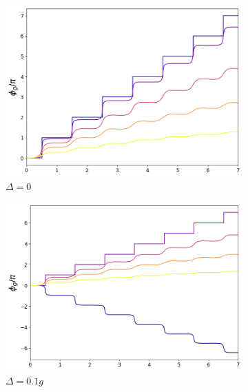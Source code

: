 \begin{figure}[H]
    \centering
    \begin{subfigure}{0.49\textwidth}
        \centering
        \includegraphics[width=\textwidth]{figuras/ch3/fg kerr.png}
        \caption{$\Delta=0$}
        \label{fig3:fg kerr 1}
    \end{subfigure}
    \vfill
    \begin{subfigure}{0.49\textwidth}
        \centering
        \includegraphics[width=\textwidth]{figuras/ch3/fg kerr d=0.1g.png}
        \caption{$\Delta=0.1g$}
        \label{fig3:fg kerr 2}
    \end{subfigure}
    \caption{}
\end{figure}
